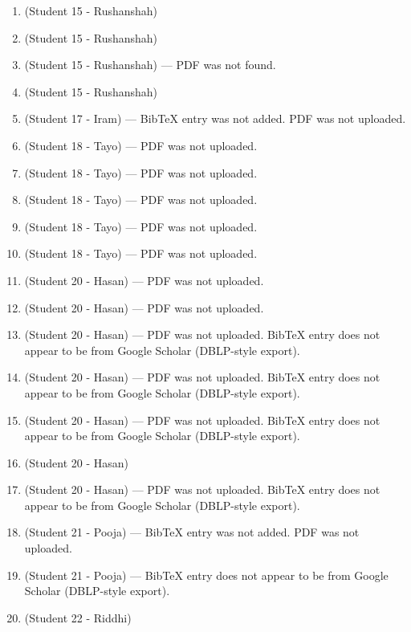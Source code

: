 \documentclass{article}
\begin{document}
\begin{enumerate}[label=\#\arabic*,noitemsep,nolistsep]
\item \cite{gu2023high} (Student 15 - Rushanshah)
\item \cite{farsangi2021rectification} (Student 15 - Rushanshah)
\item \cite{griffin1992generation} (Student 15 - Rushanshah) --- PDF was not found.
\item \cite{maurice2011pattern} (Student 15 - Rushanshah)
\item \cite{vyahhi2012bruijn} (Student 17 - Iram) --- BibTeX entry was not added. PDF was not uploaded.
\item \cite{bernad2023data} (Student 18 - Tayo) --- PDF was not uploaded.
\item \cite{adamson2023k} (Student 18 - Tayo) --- PDF was not uploaded.
\item \cite{rockey2014compactly} (Student 18 - Tayo) --- PDF was not uploaded.
\item \cite{you20256} (Student 18 - Tayo) --- PDF was not uploaded.
\item \cite{elishco2021repeat} (Student 18 - Tayo) --- PDF was not uploaded.
\item \cite{fredricksen1982survey} (Student 20 - Hasan) --- PDF was not uploaded.
\item \cite{martin1934problem} (Student 20 - Hasan) --- PDF was not uploaded.
\item \cite{mitchell1994constructing} (Student 20 - Hasan) --- PDF was not uploaded. BibTeX entry does not appear to be from Google Scholar (DBLP-style export).
\item \cite{hsieh2001decoding} (Student 20 - Hasan) --- PDF was not uploaded. BibTeX entry does not appear to be from Google Scholar (DBLP-style export).
\item \cite{wei2022nearly} (Student 20 - Hasan) --- PDF was not uploaded. BibTeX entry does not appear to be from Google Scholar (DBLP-style export).
\item \cite{kim2005generalized} (Student 20 - Hasan)
\item \cite{fan1989constructions} (Student 20 - Hasan) --- PDF was not uploaded. BibTeX entry does not appear to be from Google Scholar (DBLP-style export).
\item \cite{peng2024generation} (Student 21 - Pooja) --- BibTeX entry was not added. PDF was not uploaded.
\item \cite{11326839} (Student 21 - Pooja) --- BibTeX entry does not appear to be from Google Scholar (DBLP-style export).
\item \cite{sakata1978general} (Student 22 - Riddhi)

\end{enumerate}
\end{document}
